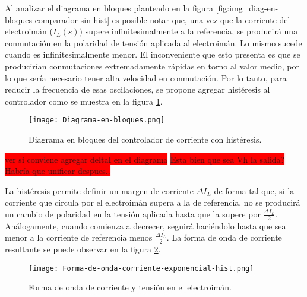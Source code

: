 



Al analizar el diagrama en bloques planteado en la figura \ref{fig:img_diag-en-bloques-comparador-sin-hist} es posible notar que, una vez que la corriente del electroimán ($I_{L}(s)$) supere infinitesimalmente a la referencia, se producirá una conmutación en la polaridad de tensión aplicada al electroimán. Lo mismo sucede cuando es infinitesimalmente menor. El inconveniente que esto presenta es que se producirían conmutaciones extremadamente rápidas en torno al valor medio, por lo que sería necesario tener alta velocidad en conmutación. Por lo tanto, para reducir la frecuencia de esas oscilaciones, se propone agregar histéresis al controlador como se muestra en la figura \ref{fig:img_diag-en-bloques}.

\begin{figure}[H]
	\centering
	\texttt{[image: Diagrama-en-bloques.png]}
	\caption{Diagrama en bloques del controlador de corriente con histéresis.}
	\label{fig:img_diag-en-bloques}
\end{figure}

\colorbox{red}{ver si conviene agregar deltaI en el diagrama}
\colorbox{red}{Esta bien que sea Vh la salida? Habría que unificar despues..}

La histéresis permite definir un margen de corriente $\Delta I_L$ de forma tal que, si la corriente que circula por el electroimán supera a la de referencia, no se producirá un cambio de polaridad en la tensión aplicada hasta que la supere por $\frac{\Delta I_L}{2}$. Análogamente, cuando comienza a decrecer, seguirá haciéndolo hasta que sea menor a la corriente de referencia menos $\frac{\Delta I_L}{2}$. La forma de onda de corriente resultante se puede observar en la figura \ref{fig:img_corriente_exponencial-hist}.

\begin{figure}[H]
	\centering
	\texttt{[image: Forma-de-onda-corriente-exponencial-hist.png]}
	\caption{Forma de onda de corriente y tensión en el electroimán.}
	\label{fig:img_corriente_exponencial-hist}
\end{figure}



